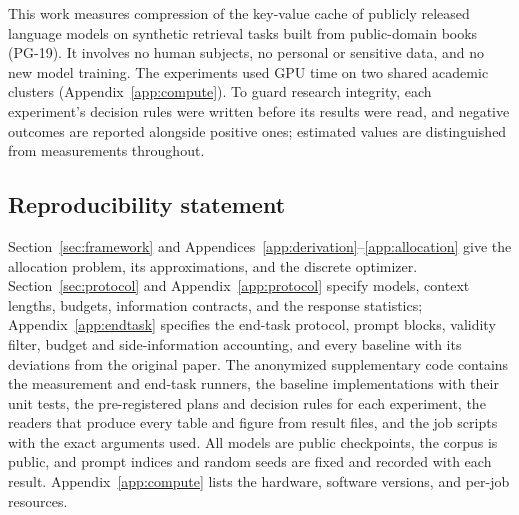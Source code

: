 \documentclass{article}
\newif\ifshowest \showesttrue
\DeclareRobustCommand{\estonly}[1]{\ifshowest#1\else\ifhmode\unskip\fi\fi}
\theoremstyle{definition}
\begin{document}
This work measures compression of the key-value cache of publicly released language models on synthetic retrieval tasks built from public-domain books (PG-19).  It involves no human subjects, no personal or sensitive data, and no new model training.  The experiments used GPU time on two shared academic clusters (Appendix~\ref{app:compute}).  To guard research integrity, each experiment's decision rules were written before its results were read, and negative outcomes are reported alongside positive ones\estonly{; estimated values are distinguished from measurements throughout}.

\subsection*{Reproducibility statement}

Section~\ref{sec:framework} and Appendices~\ref{app:derivation}--\ref{app:allocation} give the allocation problem, its approximations, and the discrete optimizer.  Section~\ref{sec:protocol} and Appendix~\ref{app:protocol} specify models, context lengths, budgets, information contracts, and the response statistics; Appendix~\ref{app:endtask} specifies the end-task protocol, prompt blocks, validity filter, budget and side-information accounting, and every baseline with its deviations from the original paper.  The anonymized supplementary code contains the measurement and end-task runners, the baseline implementations with their unit tests, the pre-registered plans and decision rules for each experiment, the readers that produce every table and figure from result files, and the job scripts with the exact arguments used.  All models are public checkpoints, the corpus is public, and prompt indices and random seeds are fixed and recorded with each result.  Appendix~\ref{app:compute} lists the hardware, software versions, and per-job resources.




\clearpage
\appendix

\end{document}
